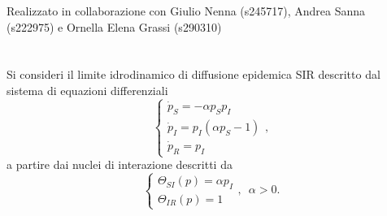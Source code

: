 \documentclass[11pt,largemargins]{homework}
\begin{document}
\maketitle
\begin{center}
Realizzato in collaborazione con Giulio Nenna (s245717), Andrea Sanna (s222975) e Ornella Elena Grassi (s290310)
\end{center}
\section{}%
Si consideri il limite idrodinamico di diffusione epidemica SIR descritto dal sistema di equazioni differenziali
\begin{equation*}
\begin {cases} \dot{p}_{S}=-\alpha p_{S}p_{I}\\\dot{p}_{I}=p_{I}\left(\alpha p_{S}-1\right)\\\dot{p}_{R}=p_{I}\end{cases},
\end{equation*}
a partire dai nuclei di interazione descritti da
\begin{equation*}
\begin {cases} \Theta_{SI}\left(p\right)=\alpha p_{I}\\\Theta_{IR}\left(p\right)=1\end{cases}, \,\,\,\alpha>0.
\end{equation*}
\end{document}
